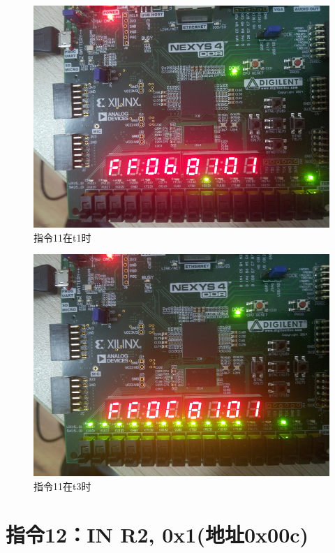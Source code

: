 \documentclass[forprint]{WHUBachelor}
\begin{document}
\begin{figure}[H]
  \centering
  \includegraphics[width=5in]{figures/download/a0.jpg}
  \caption{指令11在t1时}
  \label{fig:down:a0}
\end{figure}

\begin{figure}[H]
  \centering
  \includegraphics[width=5in]{figures/download/a2.jpg}
  \caption{指令11在t3时}
  \label{fig:down:a2}
\end{figure}


\section{指令12：IN R2, 0x1(地址0x00c)}
\end{document}
